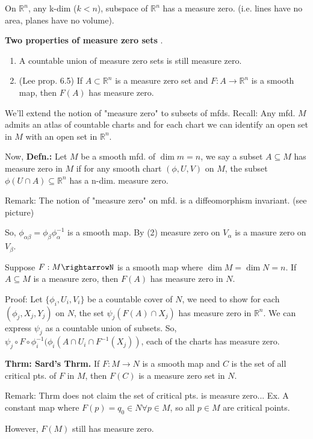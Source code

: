 \documentclass[12pt,letterpaper]{article}
\begin{document}
On $\mathbb{R}^n$, any k-dim ($k<n$), subspace of $\mathbb{R}^n$ has a measure zero. (i.e. lines have no area, planes have no volume).

\textbf{Two properties of measure zero sets }.
\begin{enumerate}
    \item A countable union of measure zero sets is still measure zero.
    \item (Lee prop. 6.5) If $A \subset \mathbb{R}^n$ is a measure zero set and $F: A \rightarrow \mathbb{R}^n$ is a smooth map, then $F(A)$ has measure zero. 
\end{enumerate}

We'll extend the notion of "measure zero" to subsets of mfds. Recall: Any mfd. $M$ admits an atlas of countable charts and for each chart we can identify an open set in $M$ with an open set in $\mathbb{R}^n$. 

Now, \textbf{Defn.:} Let $M$ be a smooth mfd. of $\dim m = n$, we say a subset $A \subseteq M$ has measure zero in $M$ if for any smooth chart $(\phi, U, V)$ on $M$, the subset $\phi (U \cap A) \subseteq \mathbb{R}^n$ has a n-dim. measure zero.

Remark: The notion of "measure zero" on mfd. is a diffeomorphism invariant. (see picture)

So, $\phi_{\alpha \beta} = \phi_{\beta} \phi_{\alpha}^{-1}$ is a smooth map. By (2) measure zero on $V_{\alpha}$ is a masure zero on $V_{\beta}$. 

Suppose $F: M\rightarrowN$ is a smooth map where $\dim M = \dim N = n$. If $A \subseteq M$ is a measure zero, then $F(A)$ has measure zero in $N$. 

Proof: Let $\{\phi_i, U_i, V_i\}$ be a countable cover of $N$, we need to show for each $(\phi_j, X_j, Y_j)$ on $N$, the set $\psi_j (F(A) \cap X_j)$ has measure zero in $\mathbb{R}^n$. We can express $\psi_j$ as a countable union of subsets. So, $\psi_j \circ F \circ \phi_i^{-1}(\phi_i (A \cap U_i \cap F^{-1}(X_j))$, each of the charts has measure zero.

\textbf{Thrm: Sard's Thrm.} If $F: M \rightarrow N$ is a smooth map and $C$ is the set of all critical pts. of $F$ in $M$, then $F(C)$ is a measure zero set in $N$. 

Remark: Thrm does not claim the set of critical pts. is measure zero... Ex. A constant map where $F(p) = q_0 \in N \forall p \in M$, so all $p \in M$ are critical points. 

However, $F(M)$ still has measure zero. 
\end{document}
